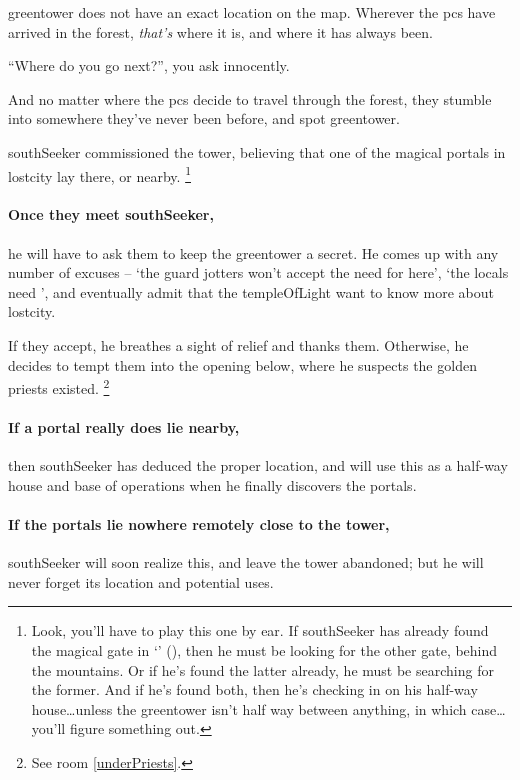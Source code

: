 
\Gls{greentower} does not have an exact location on the map.
Wherever the \glspl{pc} have arrived in the forest, \textit{that's} where it is, and where it has always been.

``Where do you go next?'', you ask innocently.

And no matter where the \glspl{pc} decide to travel through the forest, they stumble into somewhere they've never been before, and spot \gls{greentower}.

\Gls{southSeeker} commissioned the tower, believing that one of the magical portals in \gls{lostcity} lay there, or nearby.%
\footnote{Look, you'll have to play this one by ear.
If \gls{southSeeker} has already found the magical gate in `' (), then he must be looking for the other gate, behind the mountains.
Or if he's found the latter already, he must be searching for the former.
And if he's found both, then he's checking in on his half-way house\ldots unless the \gls{greentower} isn't half way between anything, in which case\ldots you'll figure something out.}

\paragraph{Once they meet \gls{southSeeker},}
he will have to ask them to keep the \gls{greentower} a secret.
He comes up with any number of excuses -- `the \gls{guard} \glspl{jotter} won't accept the need for  here', `the locals need ', and eventually admit that the \gls{templeOfLight} want to know more about \gls{lostcity}.

If they accept, he breathes a sight of relief and thanks them.
Otherwise, he decides to tempt them into the opening below, where he suspects the golden priests existed.%
\footnote{See room \vref{underPriests}.}

\paragraph{If a portal really does lie nearby,}
then \gls{southSeeker} has deduced the proper location, and will use this as a half-way house and base of operations when he finally discovers the portals.

\paragraph{If the portals lie nowhere remotely close to the tower,}
\gls{southSeeker} will soon realize this, and leave the tower abandoned; but he will never forget its location and potential uses.

